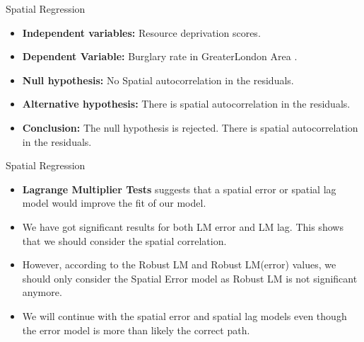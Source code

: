 \documentclass[10pt, aspectratio=169]{beamer}
\begin{document}
\begin{frame}{Spatial Regression}
    
    \small\begin{table}[!h]
        
        \caption{\label{tab:ols_summary} Estimation results of regression.}
    \end{table}
    \begin{itemize}
        \item \textbf{Independent variables:} Resource deprivation scores.
        \item \textbf{Dependent Variable:} Burglary rate in GreaterLondon Area .
        \item \textbf{Null hypothesis:} No Spatial autocorrelation in the residuals.
        \item \textbf{Alternative hypothesis:} There is spatial autocorrelation in the residuals. 
        \item \textbf{Conclusion:} The null hypothesis is rejected. There is spatial autocorrelation in the residuals.
    \end{itemize}
\end{frame}

\begin{frame}{Spatial Regression}

    \begin{adjustbox}{max width=\textwidth, keepaspectratio, rotate=0, caption={Spatial Diagnostic Tests}, float=table}
        
    \end{adjustbox}\label{tab:spat_diag}
    
    \begin{itemize}
        \item \textbf{Lagrange Multiplier Tests} suggests that a spatial error or spatial lag model would improve the fit of our model.
        \item We have got significant results for both LM error and LM lag. This shows that we should consider the spatial correlation. 
        \item However, according to the Robust LM and Robust LM(error) values, we should only consider the Spatial Error model as Robust LM is not significant anymore.
        \item We will continue with the spatial error and spatial lag models even though the error model is more than likely the correct path. 
    \end{itemize}
    
\end{frame}
\end{document}
